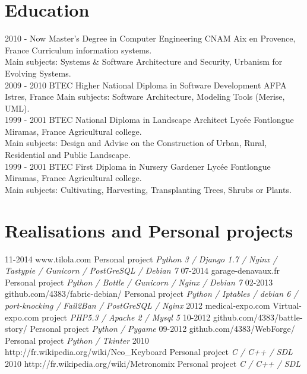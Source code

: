 \documentclass[]{friggeri-cv}
\begin{document}
\section{Education}
\begin{entrylist}
  \entry
    {2010 - Now}
    {Master's Degree in Computer Engineering}
    {CNAM Aix en Provence, France}
    {Curriculum information systems.\\
    Main subjects: Systems \& Software Architecture and Security, Urbanism for Evolving Systems.\\}
  \entry
    {2009 - 2010}
    {BTEC Higher National Diploma in Software Development}
    {AFPA Istres, France}
    {Main subjects: Software Architecture, Modeling Tools (Merise, UML).\\}
  \entry
    {1999 - 2001}
    {BTEC National Diploma in Landscape Architect}
    {Lycée Fontlongue Miramas, France}
    {Agricultural college.\\
    Main subjects: Design and Advise on the Construction of Urban, Rural, Residential and Public Landscape.\\}
  \entry
    {1999 - 2001}
    {BTEC First Diploma in Nursery Gardener}
    {Lycée Fontlongue Miramas, France}
    {Agricultural college.\\
    Main subjects: Cultivating, Harvesting, Transplanting Trees, Shrubs or Plants.}
\end{entrylist}

\section{Realisations and Personal projects}
\begin{entrylist}
  \entry
    {11-2014}
    {www.tilola.com}
    {Personal project}
    {\emph{Python 3 / Django 1.7 / Nginx / Tastypie / Gunicorn / PostGreSQL / Debian 7}}
  \entry
    {07-2014}
    {garage-denavaux.fr}
    {Personal project}
    {\emph{Python / Bottle / Gunicorn / Nginx / Debian 7}}
  \entry
    {02-2013}
    {github.com/4383/fabric-debian/}
    {Personal project}
    {\emph{Python / Iptables /  debian 6 / port-knocking / Fail2Ban / PostGreSQL / Nginx}}
  \entry
    {2012}
    {medical-expo.com}
    {Virtual-expo.com project}
    {\emph{PHP5.3 / Apache 2 / Mysql 5}}
  \entry
    {10-2012}
    {github.com/4383/battle-story/}
    {Personal project}
    {\emph{Python / Pygame}}
  \entry
    {09-2012}
    {github.com/4383/WebForge/}
    {Personal project}
    {\emph{Python / Tkinter}}
  \entry
    {2010}
    {http://fr.wikipedia.org/wiki/Neo\_Keyboard}
    {Personal project}
    {\emph{C / C++ / SDL}}
  \entry
    {2010}
    {http://fr.wikipedia.org/wiki/Metronomix}
    {Personal project}
    {\emph{C / C++ / SDL}}
\end{entrylist}
\end{document}
